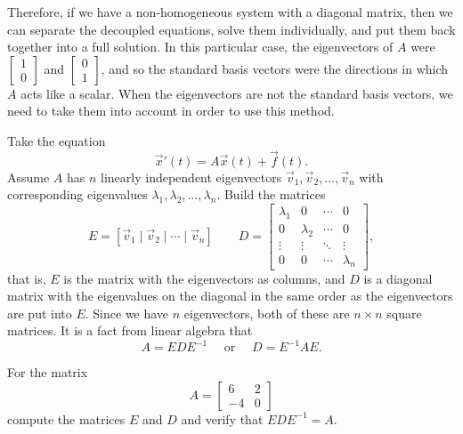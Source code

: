 Therefore, if we have a non-homogeneous system with a diagonal matrix, then we can separate the decoupled equations, solve them individually, and put them back together into a full solution. In this particular case, the eigenvectors of $A$ were $\begin{bmatrix} 1 \\ 0 \end{bmatrix}$ and $\begin{bmatrix} 0 \\ 1 \end{bmatrix}$, and so the standard basis vectors were the directions in which $A$ acts like a scalar. When the eigenvectors are not the standard basis vectors, we need to take them into account in order to use this method.

Take the equation
\begin{equation} \label{nhsys:ednhsys}
{\vec{x}}' (t) = A \vec{x}(t) + \vec{f}(t) .
\end{equation}
Assume $A$ has $n$ linearly independent eigenvectors
$\vec{v}_1, \vec{v}_2, \ldots, \vec{v}_n$ with corresponding eigenvalues $\lambda_1, \lambda_2, \ldots, \lambda_n$. Build the matrices 
\begin{equation*}
E = \left[ \vec{v}_1 \mid \vec{v}_2 \mid \cdots \mid \vec{v}_n \right] \qquad D = \begin{bmatrix} \lambda_1 & 0 & \cdots & 0 \\ 0 & \lambda_2 & \cdots & 0 \\ \vdots & \vdots & \ddots & \vdots \\ 0 & 0 & \cdots & \lambda_n \end{bmatrix},
\end{equation*}
that is, $E$ is the matrix with the eigenvectors as columns, and $D$ is a diagonal matrix with the eigenvalues on the diagonal in the same order as the eigenvectors are put into $E$. Since we have $n$ eigenvectors, both of these are $n \times n$ square matrices. It is a fact from linear algebra that
\begin{equation*}
A = EDE^{-1} \quad \text{ or } \quad D = E^{-1}AE.
\end{equation*}

\begin{exercise}
For the matrix 
\begin{equation*}
A = \begin{bmatrix} 6 & 2 \\ -4 & 0 \end{bmatrix}
\end{equation*}
compute the matrices $E$ and $D$ and verify that $EDE^{-1} = A$. 
\end{exercise}

